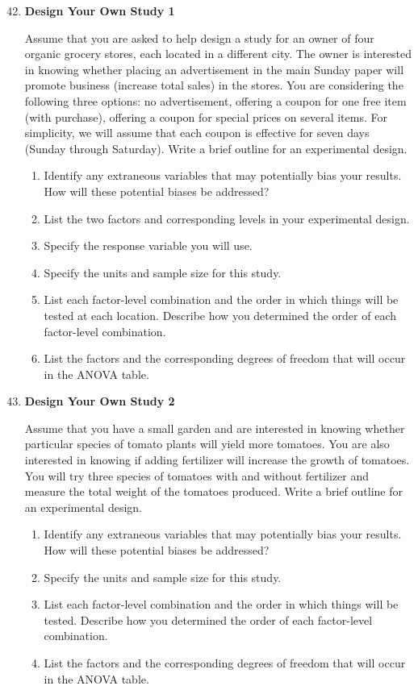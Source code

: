 \documentclass[
]{book}
\begin{document}
\begin{enumerate}
  \setcounter{enumi}{41}

  \item \textbf{Design Your Own Study 1}

Assume that you are asked to help design a study for an owner of four organic grocery stores, each located in a different city. The owner is interested in knowing whether placing an advertisement in the main Sunday paper will promote business (increase total sales) in the stores. You are considering the following three options: no advertisement, offering a coupon for one free item (with purchase), offering a coupon for special prices on several items. For simplicity, we will assume that each coupon is effective for seven days (Sunday through Saturday). Write a brief outline for an experimental design.
  \begin{enumerate}
    \item Identify any extraneous variables that may potentially bias your results. How will these potential biases be addressed?
    \item List the two factors and corresponding levels in your experimental design.
    \item Specify the response variable you will use.
    \item Specify the units and sample size for this study.
    \item List each factor-level combination and the order in which things will be tested at each location. Describe how you determined the order of each factor-level combination.
    \item List the factors and the corresponding degrees of freedom that will occur in the ANOVA table.
  \end{enumerate}

  \item \textbf{Design Your Own Study 2}

Assume that you have a small garden and are interested in knowing whether particular species of tomato plants will yield more tomatoes. You are also interested in knowing if adding fertilizer will increase the growth of tomatoes. You will try three species of tomatoes with and without fertilizer and measure the total weight of the tomatoes produced. Write a brief outline for an experimental design.
  \begin{enumerate}
    \item Identify any extraneous variables that may potentially bias your results. How will these potential biases be addressed?
    \item Specify the units and sample size for this study.
    \item List each factor-level combination and the order in which things will be tested. Describe how you determined the order of each factor-level combination.
    \item List the factors and the corresponding degrees of freedom that will occur in the ANOVA table.
  \end{enumerate}


\end{enumerate}
\end{document}
